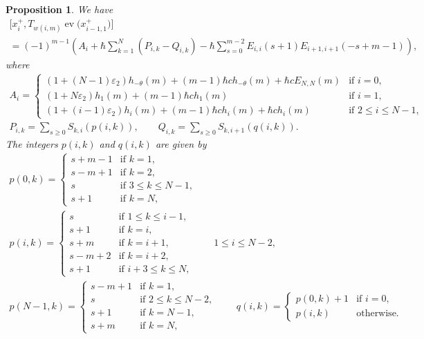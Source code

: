 \documentclass[10pt,a4paper]{amsart}
\newtheorem{prop}[thm]{Proposition}
\theoremstyle{definition}
\numberwithin{equation}{section}
\DeclareMathOperator{\ev}{ev}
\newcommand{\ve}{\varepsilon}
\begin{document}
\begin{prop}\label{prop:braket}
We have
\begin{gather}
\big[x_i^+, T_{w(i,m)} \ev\big(x_{i-1,1}^+\big)\big] \nonumber\\
= (-1)^{m-1} \left(A_i + \hbar \sum_{k=1}^N (P_{i,k}-Q_{i,k}) - \hbar \sum_{s=0}^{m-2} E_{i,i}(s+1)E_{i+1,i+1}(-s+m-1) \right),\label{eq:braket}
\end{gather}
where
\begin{gather*}
A_i = \begin{cases}
(1+(N-1)\ve_2)h_{-\theta}(m) + (m-1)\hbar ch_{-\theta}(m)+ \hbar c E_{N,N}(m) & \text{if $i=0$}, \\
(1+N\ve_2)h_1(m) + (m-1)\hbar ch_{1}(m)& \text{if $i=1$}, \\
(1+(i-1)\ve_2)h_{i}(m) + (m-1)\hbar ch_{i}(m) + \hbar c h_{i}(m) & \text{if $2 \leq i \leq N-1$},
\end{cases}
\\
P_{i,k} = \sum_{s \geq 0} S_{k,i}(p(i,k)), \qquad Q_{i,k} = \sum_{s \geq 0} S_{k,i+1}(q(i,k)).
\end{gather*}
The integers $p(i,k)$ and $q(i,k)$ are given by
\begin{gather*}
p(0,k)= \begin{cases}
s+m-1 & \text{if $k=1$},\\
s-m+1 & \text{if $k=2$},\\
s & \text{if $3 \leq k \leq N-1$},\\
s+1 & \text{if $k=N$},
\end{cases}\\
p(i,k)= \begin{cases}
s & \text{if $1 \leq k \leq i-1$},\\
s+1 & \text{if $k=i$},\\
s+m & \text{if $k=i+1$},\\
s-m+2 & \text{if $k=i+2$},\\
s+1 & \text{if $i+3 \leq k \leq N$},
\end{cases}\qquad 1 \leq i \leq N-2,\\
p(N-1,k)= \begin{cases}
s-m+1 & \text{if $k=1$},\\
s & \text{if $2 \leq k \leq N-2$},\\
s+1 & \text{if $k=N-1$},\\
s+m & \text{if $k=N$},
\end{cases}\qquad
q(i,k)=\begin{cases}
p(0,k)+1 & \text{if $i=0$},\\
p(i,k) &\text{otherwise}.
\end{cases}
\end{gather*}
\end{prop}
\end{document}
